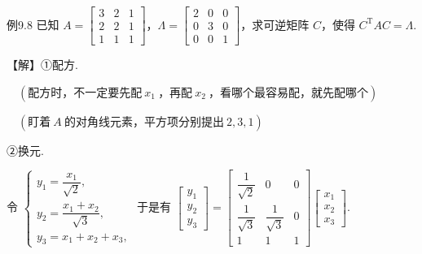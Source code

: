 \begin{fcard}{例9.8}
已知 $A=\begin{bmatrix}3&2&1\\2&2&1\\1&1&1\end{bmatrix}$，$\Lambda=\begin{bmatrix}2&0&0\\0&3&0\\0&0&1\end{bmatrix}$，求可逆矩阵 $C$，使得 $C^{\mathrm T}AC=\Lambda$.

【解】①配方.



$\quad(\text{配方时，不一定要先配}\ x_1\ \text{，再配}\ x_2\ \text{，看哪个最容易配，就先配哪个})$

$\quad(\text{盯着}\ A\ \text{的对角线元素，平方项分别提出}\ 2,3,1)$


②换元.

令 $\begin{cases}y_1=\dfrac{x_1}{\sqrt2},\\[8pt]y_2=\dfrac{x_1+x_2}{\sqrt3},\\[8pt]y_3=x_1+x_2+x_3,\end{cases}$ 于是有 $\begin{bmatrix}y_1\\y_2\\y_3\end{bmatrix}=\begin{bmatrix}\dfrac{1}{\sqrt2}&0&0\\[8pt]\dfrac{1}{\sqrt3}&\dfrac{1}{\sqrt3}&0\\[8pt]1&1&1\end{bmatrix}\begin{bmatrix}x_1\\x_2\\x_3\end{bmatrix}$.


\end{fcard}
